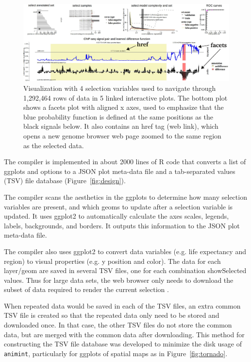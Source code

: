 \documentclass[12pt]{article}\usepackage[]{graphicx}\usepackage[]{color}
\begin{document}
\begin{figure}[b!]
  \centering
  \includegraphics[width=\textwidth]{figure-chip-seq}
  \caption{Visualization with 4 selection variables used to navigate
    through 1,292,464 rows of data in 5 linked interactive plots. The
    bottom plot shows a facets plot with aligned x axes, used to
    emphasize that the blue probability function is defined at the
    same positions as the black signals below. It also contains an
    href tag (web link), which opens a new genome browser web page
    zoomed to the same region as the selected data.}
  \label{fig:ChIPseq}
\end{figure}

The compiler is implemented in about 2000 lines of R code that
converts a list of ggplots and options to a JSON plot meta-data file
and a tab-separated values (TSV) file database
(Figure~\ref{fig:design}).

The compiler scans the aesthetics in the ggplots to determine
how many selection variables are present, and which geoms to update
after a selection variable is updated. It uses ggplot2 to
automatically calculate the axes scales, legends, labels, backgrounds,
and borders. It outputs this information to the JSON plot meta-data
file. 

The compiler also uses ggplot2 to convert data variables (e.g. life
expectancy and region) to visual properties (e.g. y position and
color). The data for each layer/geom are saved in several TSV files,
one for each combination showSelected values. Thus for large data
sets, the web browser only needs to download the subset of data
required to render the current selection \citep{2013-immens}.

When repeated data would be saved in each of the TSV files, an extra
common TSV file is created so that the repeated data only need to be
stored and downloaded once. In that case, the other TSV files do not
store the common data, but are merged with the common data after
downloading. This method for constructing the TSV file database was
developed to minimize the disk usage of \texttt{animint}, particularly
for ggplots of spatial maps as in Figure~\ref{fig:tornado}.
\end{document}
